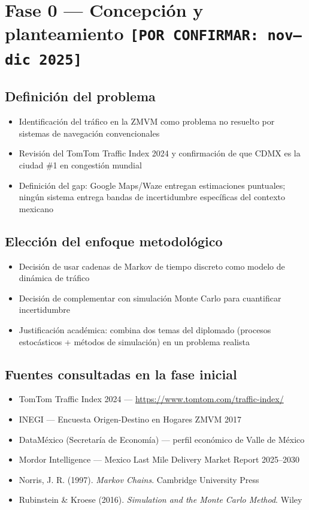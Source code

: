 \documentclass[11pt,a4paper]{article}
\begin{document}
\section{Fase 0 --- Concepción y planteamiento \texttt{[POR CONFIRMAR: nov--dic 2025]}}

\subsection{Definición del problema}
\begin{itemize}
  \item Identificación del tráfico en la ZMVM como problema no resuelto por sistemas de navegación convencionales
  \item Revisión del TomTom Traffic Index 2024 y confirmación de que CDMX es la ciudad \#1 en congestión mundial
  \item Definición del gap: Google Maps/Waze entregan estimaciones puntuales; ningún sistema entrega bandas de incertidumbre específicas del contexto mexicano
\end{itemize}

\subsection{Elección del enfoque metodológico}
\begin{itemize}
  \item Decisión de usar cadenas de Markov de tiempo discreto como modelo de dinámica de tráfico
  \item Decisión de complementar con simulación Monte Carlo para cuantificar incertidumbre
  \item Justificación académica: combina dos temas del diplomado (procesos estocásticos + métodos de simulación) en un problema realista
\end{itemize}

\subsection{Fuentes consultadas en la fase inicial}
\begin{itemize}
  \item TomTom Traffic Index 2024 --- \url{https://www.tomtom.com/traffic-index/}
  \item INEGI --- Encuesta Origen-Destino en Hogares ZMVM 2017
  \item DataMéxico (Secretaría de Economía) --- perfil económico de Valle de México
  \item Mordor Intelligence --- Mexico Last Mile Delivery Market Report 2025--2030
  \item Norris, J. R. (1997). \textit{Markov Chains}. Cambridge University Press
  \item Rubinstein \& Kroese (2016). \textit{Simulation and the Monte Carlo Method}. Wiley
\end{itemize}
\end{document}
